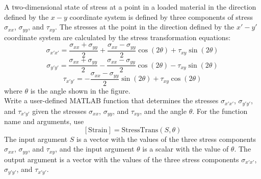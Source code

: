 \documentclass[a4paper, 12pt]{report}
\def\ni{blue!20!white}
\def\link{blue!50!black}
\begin{document}
    \begin{tcolorbox}[title={\color{black}{\section{Q11}}}, colback=white, colframe=\ni, boxrule=1mm, width=1\textwidth]    
        A two-dimensional state of stress at a point in a loaded material in the direction defined by the \( x - y \) coordinate system is defined by three components of stress \( \sigma_{xx} \), \( \sigma_{yy} \), and \( \tau_{xy} \). The stresses at the point in the direction defined by the \( x' - y' \) coordinate system are calculated by the stress transformation equations:
        \[\sigma_{x' x'} = \frac{\sigma_{xx} + \sigma_{yy}}{2} + \frac{\sigma_{xx} - \sigma_{yy}}{2} \cos(2\theta) + \tau_{xy} \sin(2\theta)\]
        \[\sigma_{y' y'} = \frac{\sigma_{xx} + \sigma_{yy}}{2} - \frac{\sigma_{xx} - \sigma_{yy}}{2} \cos(2\theta) - \tau_{xy} \sin(2\theta)\]
        \[\tau_{x' y'} = -\frac{\sigma_{xx} - \sigma_{yy}}{2} \sin(2\theta) + \tau_{xy} \cos(2\theta)\]
        where \( \theta \) is the angle shown in the figure.\\[8pt]
        Write a user-defined MATLAB function that determines the stresses \( \sigma_{x' x'} \), \( \sigma_{y' y'} \), and \( \tau_{x' y'} \) given the stresses \( \sigma_{xx} \), \( \sigma_{yy} \), and \( \tau_{xy} \), and the angle \( \theta \). For the function name and arguments, use 
        \[[\text{Strain}] = \text{StressTrans}(S, \theta)\]
        The input argument \( S \) is a vector with the values of the three stress components \( \sigma_{xx} \), \( \sigma_{yy} \), and \( \tau_{xy} \), and the input argument \( \theta \) is a scalar with the value of \( \theta \). The output argument  is a vector with the values of the three stress components \( \sigma_{x' x'} \), \( \sigma_{y' y'} \), and \( \tau_{x' y'} \).
   \end{tcolorbox}
    
\end{document}
